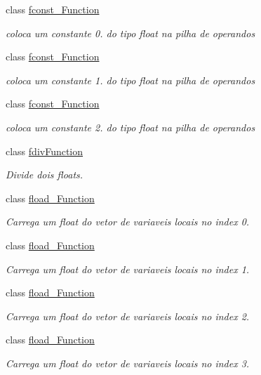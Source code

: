 \begin{DoxyCompactItemize}
class \hyperlink{classInstruction_1_1fconst__0Function}{fconst\+\_\+Function}
\begin{DoxyCompactList}\small\item\em coloca um constante 0. do tipo float na pilha de operandos \end{DoxyCompactList}\item 
class \hyperlink{classInstruction_1_1fconst__1Function}{fconst\+\_\+Function}
\begin{DoxyCompactList}\small\item\em coloca um constante 1. do tipo float na pilha de operandos \end{DoxyCompactList}\item 
class \hyperlink{classInstruction_1_1fconst__2Function}{fconst\+\_\+Function}
\begin{DoxyCompactList}\small\item\em coloca um constante 2. do tipo float na pilha de operandos \end{DoxyCompactList}\item 
class \hyperlink{classInstruction_1_1fdivFunction}{fdiv\+Function}
\begin{DoxyCompactList}\small\item\em Divide dois floats. \end{DoxyCompactList}\item 
class \hyperlink{classInstruction_1_1fload__0Function}{fload\+\_\+Function}
\begin{DoxyCompactList}\small\item\em Carrega um float do vetor de variaveis locais no index 0. \end{DoxyCompactList}\item 
class \hyperlink{classInstruction_1_1fload__1Function}{fload\+\_\+Function}
\begin{DoxyCompactList}\small\item\em Carrega um float do vetor de variaveis locais no index 1. \end{DoxyCompactList}\item 
class \hyperlink{classInstruction_1_1fload__2Function}{fload\+\_\+Function}
\begin{DoxyCompactList}\small\item\em Carrega um float do vetor de variaveis locais no index 2. \end{DoxyCompactList}\item 
class \hyperlink{classInstruction_1_1fload__3Function}{fload\+\_\+Function}
\begin{DoxyCompactList}\small\item\em Carrega um float do vetor de variaveis locais no index 3. \end{DoxyCompactList}\item 

\end{DoxyCompactItemize}

